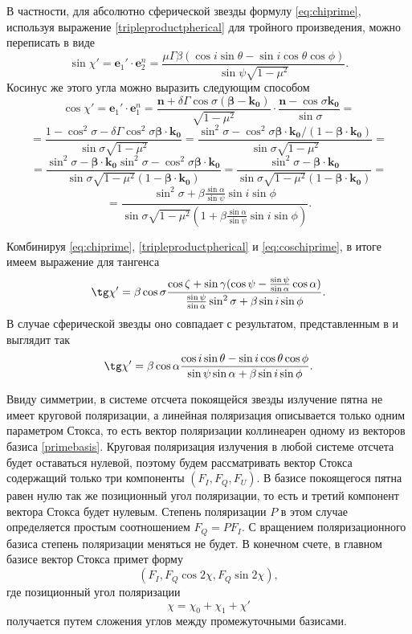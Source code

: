 \documentclass[14pt,a4paper]{extarticle}
\newcommand{\be}{\begin{equation}}
\newcommand{\ee}{\end{equation}}
\begin{document}
			В частности, для абсолютно сферической звезды 
			формулу \eqref{eq:chiprime},
			используя выражение \eqref{tripleproductpherical} для тройного произведения,
			можно переписать в виде
			\be\label{chiprimespherical}
			\sin{\chi'}=\bm{e}_1'\cdot \bm{e}_2^n =
			 \frac{\mu\Gamma\beta (\cos i \sin \theta - \sin i \cos \theta \cos \phi)}{\sin{\psi}\sqrt{1-\mu^2} }.
			\ee
			Косинус же этого угла можно выразить следующим способом    
			$$
				\cos\chi'=\bm{e}_1'\cdot \bm{e}_1^n =\frac{\bm n + \delta  \Gamma \cos\sigma (\bm \beta - \bm{k_0} ) }{\sqrt{1-\mu^2} }\cdot
				\frac{\bm n - \cos \sigma  \bm{k_0} }{\sin{\sigma}} = $$
			$$
				=\frac{1-\cos^2\sigma-\delta \Gamma \cos^2 \sigma \bm \beta \cdot \bm{k_0} }{\sin{\sigma}\sqrt{1-\mu^2} } 
				=\frac{\sin^2\sigma-  \cos^2 \sigma \bm \beta \cdot \bm{k_0} /(1-\bm \beta \cdot \bm{k_0}) }{\sin{\sigma}\sqrt{1-\mu^2} } =
			$$
			$$
				=\frac{\sin^2\sigma -\bm \beta \cdot \bm{k_0} \sin^2\sigma - \cos^2 \sigma \bm \beta \cdot \bm{k_0} }{\sin{\sigma}\sqrt{1-\mu^2} (1-\bm \beta \cdot \bm{k_0}) } 
				=\frac{\sin^2\sigma -\bm \beta \cdot \bm{k_0}  }{\sin{\sigma}\sqrt{1-\mu^2} (1-\bm \beta \cdot \bm{k_0}) } =
			$$\be\label{eq:coschiprime}
				=\frac{\sin^2\sigma + \beta \frac{\sin \alpha }{\sin\psi} \sin i \sin \phi }{\sin{\sigma}\sqrt{1-\mu^2} (1+ \beta \frac{\sin \alpha }{\sin\psi} \sin i \sin \phi) }.	
			\ee

			Комбинируя \eqref{eq:chiprime}, \eqref{tripleproductpherical} и \eqref{eq:coschiprime}, в итоге имеем выражение для тангенса
			\be
			\tg\chi' = \beta \cos \sigma \frac{
				\cos\zeta + \sin \gamma (\cos \psi - \frac
					{\sin \psi}
					{\sin \alpha}
				\cos \alpha)}
				{\frac{\sin \psi}{\sin \alpha}\sin^{2}\sigma + \beta \sin i \sin \phi}.
			\ee
			В случае сферической звезды оно совпадает с результатом, представленным в \cite{Viironen2004} и выглядит так
			\be
			\tg\chi' = \beta \cos \alpha \frac{\cos i \sin \theta - \sin i \cos \theta \cos \phi}{\sin \psi\sin\alpha + \beta \sin i \sin \phi}.
			\ee





			Ввиду симметрии, в системе отсчета покоящейся звезды излучение пятна не имеет круговой поляризации, а линейная поляризация описывается только одним параметром Стокса, то есть вектор поляризации коллинеарен одному из векторов базиса \eqref{primebasis}. 
			Круговая поляризация излучения в любой системе отсчета будет оставаться нулевой, поэтому будем рассматривать вектор Стокса содержащий только три компоненты $(F_I,F_Q,F_U)$.
			В базисе покоящегося пятна равен нулю так же позиционный угол поляризации, то есть и третий компонент вектора Стокса будет нулевым.
			Степень поляризации $P$ в этом случае определяется простым соотношением $F_Q=P F_I$.
			С вращением поляризационного базиса степень поляризации меняться не будет.
			В конечном счете, в главном базисе вектор Стокса примет форму 
			\be
				(F_I, F_Q \cos{2\chi},F_Q \sin{2\chi}),
			\ee
		    где позиционный угол поляризации
			\be
			\chi=\chi_0+\chi_1+ \chi'\ee
			получается путем сложения углов между промежуточными базисами.
\end{document}
